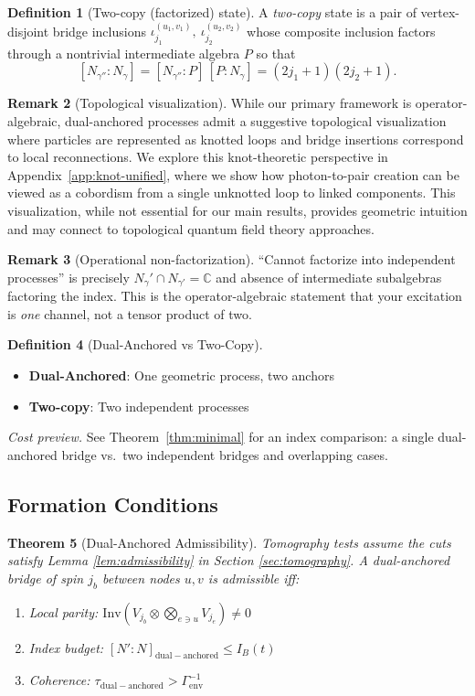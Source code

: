 \documentclass[11pt]{article}
\newcommand{\Index}[2]{\left[#1:#2\right]}
\newcommand{\Inv}{\mathrm{Inv}}
\theoremstyle{plain}
\newtheorem{theorem}{Theorem}[section]
\theoremstyle{definition}
\newtheorem{definition}[theorem]{Definition}
\newtheorem{remark}[theorem]{Remark}
\begin{document}
\begin{definition}[Two-copy (factorized) state]\label{def:two-copy}
  A \emph{two-copy} state is a pair of vertex-disjoint bridge inclusions
  \(
    \iota^{(u_1,v_1)}_{j_1},\ \iota^{(u_2,v_2)}_{j_2}
  \)
  whose composite inclusion factors through a nontrivial intermediate algebra
  $P$ so that
  \[
    \Index{N_{\gamma''}}{N_\gamma}
    = \Index{N_{\gamma''}}{P}\,\Index{P}{N_\gamma}
    = (2j_1+1)(2j_2+1).
  \]
\end{definition}
\begin{remark}[Topological visualization]
  While our primary framework is operator-algebraic, dual-anchored processes admit a suggestive topological visualization where particles are represented as knotted loops and bridge insertions correspond to local reconnections. We explore this knot-theoretic perspective in Appendix~\ref{app:knot-unified}, where we show how photon-to-pair creation can be viewed as a cobordism from a single unknotted loop to linked components. This visualization, while not essential for our main results, provides geometric intuition and may connect to topological quantum field theory approaches.
\end{remark}
\begin{remark}[Operational non-factorization]
  “Cannot factorize into independent processes” is precisely $N_\gamma' \cap N_{\gamma'}=\mathbb{C}$ and absence of intermediate subalgebras factoring the index. This is the operator-algebraic statement that your excitation is \emph{one} channel, not a tensor product of two.
\end{remark}

\begin{definition}[Dual-Anchored vs Two-Copy]
  \begin{itemize}
    \item \textbf{Dual-Anchored}: One geometric process, two anchors
    \item \textbf{Two-copy}: Two independent processes
  \end{itemize}
\end{definition}
\noindent\emph{Cost preview.}
See Theorem~\ref{thm:minimal} for an index comparison: a single dual-anchored bridge vs.\ two independent bridges and overlapping cases.

\subsection{Formation Conditions}
\begin{theorem}[Dual-Anchored Admissibility]
  Tomography tests assume the cuts satisfy Lemma \ref{lem:admissibility} in Section \ref{sec:tomography}.
  A dual-anchored bridge of spin $j_b$ between nodes $u,v$ is admissible iff:
  \begin{enumerate}
    \item Local parity: $\Inv(V_{j_b} \otimes \bigotimes_{e \ni u} V_{j_e}) \neq 0$
    \item Index budget: $[N':N]_{\mathrm{dual-anchored}} \leq I_B(t)$
    \item Coherence: $\tau_{\mathrm{dual-anchored}} > \Gamma_{\mathrm{env}}^{-1}$
  \end{enumerate}
\end{theorem}
\end{document}
